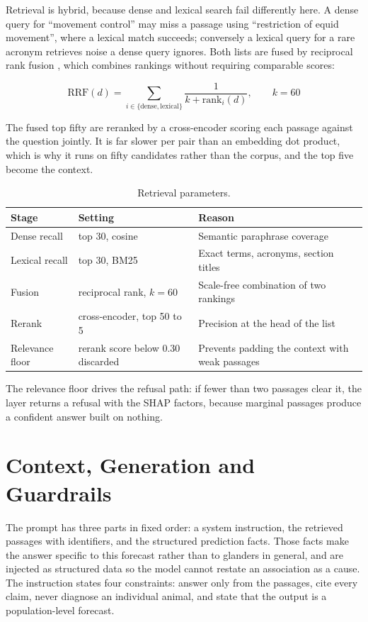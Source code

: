 \documentclass[10pt,openany]{report}
\begin{document}


Retrieval is hybrid, because dense and lexical search \cite{robertson2009} fail differently here. A
dense query for ``movement control'' may miss a passage using ``restriction of equid movement'', where
a lexical match succeeds; conversely a lexical query for a rare acronym retrieves noise a dense query
ignores. Both lists are fused by reciprocal rank fusion \cite{cormack2009}, which combines rankings
without requiring comparable scores:

\[
\mathrm{RRF}(d) = \sum_{i \in \{\text{dense},\text{lexical}\}} \frac{1}{k + \mathrm{rank}_i(d)},
\qquad k = 60
\]

The fused top fifty are reranked by a cross-encoder scoring each passage against the question
jointly. It is far slower per pair than an embedding dot product, which is why it runs on fifty
candidates rather than the corpus, and the top five become the context.

\begin{table}[htbp]
\centering
\caption{Retrieval parameters.}
\label{tab:retrieval}
\small
\begin{tabular}{@{}lll@{}}
\toprule
\textbf{Stage} & \textbf{Setting} & \textbf{Reason} \\
\midrule
Dense recall & top 30, cosine & Semantic paraphrase coverage \\
Lexical recall & top 30, BM25 & Exact terms, acronyms, section titles \\
Fusion & reciprocal rank, $k=60$ & Scale-free combination of two rankings \\
Rerank & cross-encoder, top 50 to 5 & Precision at the head of the list \\
Relevance floor & rerank score below 0.30 discarded & Prevents padding the context with weak passages \\
\bottomrule
\end{tabular}
\end{table}

The relevance floor drives the refusal path: if fewer than two passages clear it, the layer returns a
refusal with the SHAP factors, because marginal passages produce a confident answer built on
nothing.

\section{Context, Generation and Guardrails}

The prompt has three parts in fixed order: a system instruction, the retrieved passages with
identifiers, and the structured prediction facts. Those facts make the answer specific to this
forecast rather than to glanders in general, and are injected as structured data so the model cannot
restate an association as a cause. The instruction states four constraints: answer only from the
passages, cite every claim, never diagnose an individual animal, and state that the output is a
population-level forecast.
\end{document}
